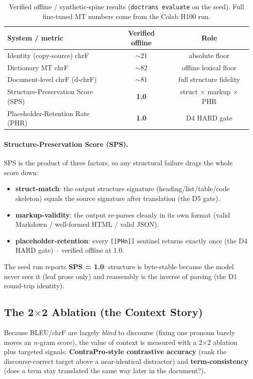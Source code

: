 \documentclass[12pt,a4paper]{article}
\begin{document}
\begin{table}[H]
\centering
\caption{Verified offline / synthetic-spine results (\texttt{doctrans evaluate} on the seed). Full fine-tuned MT numbers come from the Colab H100 run.}
\begin{tabular}{lcc}
\toprule
\textbf{System / metric} & \textbf{Verified offline} & \textbf{Role} \\
\midrule
Identity (copy-source) chrF & $\sim$21 & absolute floor \\
Dictionary MT chrF & $\sim$82 & offline lexical floor \\
Document-level chrF (d-chrF) & $\sim$81 & full structure fidelity \\
Structure-Preservation Score (SPS) & \textbf{1.0} & struct $\times$ markup $\times$ PHR \\
Placeholder-Retention Rate (PHR) & \textbf{1.0} & D4 HARD gate \\
\bottomrule
\end{tabular}
\end{table}

\paragraph{Structure-Preservation Score (SPS).} SPS is the product of three factors, so any structural failure drags the whole score down:
\begin{itemize}
  \item \textbf{struct-match}: the output structure signature (heading/list/table/code skeleton) equals the source signature after translation (the D5 gate).
  \item \textbf{markup-validity}: the output re-parses cleanly in its own format (valid Markdown / well-formed HTML / valid JSON).
  \item \textbf{placeholder-retention}: every \texttt{[[PHn]]} sentinel returns exactly once (the D4 HARD gate) -- verified offline at 1.0.
\end{itemize}
The seed run reports \textbf{SPS = 1.0}: structure is byte-stable because the model never sees it (leaf prose only) and reassembly is the inverse of parsing (the D1 round-trip identity).

\subsection{The 2$\times$2 Ablation (the Context Story)}

Because BLEU/chrF are largely \emph{blind} to discourse (fixing one pronoun barely moves an $n$-gram score), the value of context is measured with a 2$\times$2 ablation plus targeted signals: \textbf{ContraPro-style contrastive accuracy} (rank the discourse-correct target above a near-identical distractor) and \textbf{term-consistency} (does a term stay translated the same way later in the document?).
\end{document}
